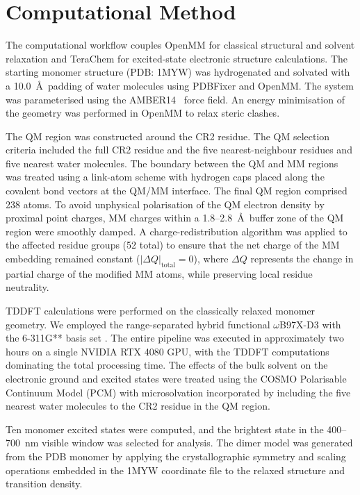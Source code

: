 \documentclass[journal=jpclcd, manuscript=letter, layout=twocolumn, doi=true]{achemso}
\begin{document}
\section{Computational Method}

The computational workflow couples OpenMM \cite{openmm2017} for classical structural and solvent relaxation and TeraChem \cite{terachem2009,seritan2021terachem} for excited-state electronic structure calculations. The starting monomer structure (PDB: 1MYW) was hydrogenated and solvated with a 10.0~\AA\ padding of water molecules using PDBFixer and OpenMM. The system was parameterised using the AMBER14~\cite{amber14_manual} force field. An energy minimisation of the geometry was performed in OpenMM to relax steric clashes.

The QM region was constructed around the CR2 residue. The QM selection criteria included the full CR2 residue and the five nearest-neighbour residues and five nearest water molecules. The boundary between the QM and MM regions was treated using a link-atom scheme with hydrogen caps placed along the covalent bond vectors at the QM/MM interface. The final QM region comprised 238 atoms. To avoid unphysical polarisation of the QM electron density by proximal point charges, MM charges within a 1.8--2.8~\AA\ buffer zone of the QM region were smoothly damped. A charge-redistribution algorithm was applied to the affected residue groups (52 total) to ensure that the net charge of the MM embedding remained constant ($|\Delta Q|_{\mathrm{total}}=0$), where $\Delta Q$ represents the change in partial charge of the modified MM atoms, while preserving local residue neutrality.

TDDFT calculations were performed on the classically relaxed monomer geometry. We employed the range-separated hybrid functional $\omega$B97X-D3 with the 6-311G** basis set \cite{mardirossian2017}. The entire pipeline was executed in approximately two hours on a single NVIDIA RTX 4080 GPU, with the TDDFT computations dominating the total processing time. The effects of the bulk solvent on the electronic ground and excited states were treated using the COSMO Polarisable Continuum Model (PCM) \cite{seritan2021terachem} with microsolvation incorporated by including the five nearest water molecules to the CR2 residue in the QM region.

Ten monomer excited states were computed, and the brightest state in the 400--700~nm visible window was selected for analysis. The dimer model was generated from the PDB monomer by applying the crystallographic symmetry and scaling operations embedded in the 1MYW coordinate file to the relaxed structure and transition density. 
\end{document}

